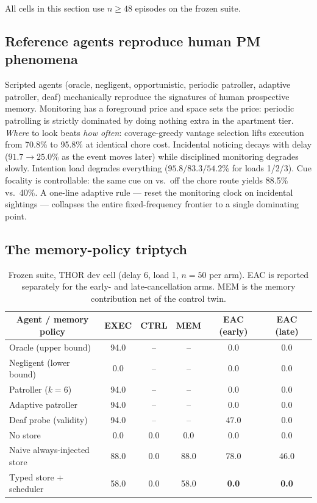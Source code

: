 \documentclass{article} %
\begin{document}
All cells in this section use $n{\ge}48$ episodes on the frozen suite.

\subsection{Reference agents reproduce human PM phenomena}

Scripted agents (oracle, negligent, opportunistic, periodic patroller,
adaptive patroller, deaf) mechanically reproduce the signatures of human
prospective memory. Monitoring has a foreground price and space sets the price:
periodic patrolling is strictly dominated by doing nothing extra in the
apartment tier. \emph{Where} to look beats \emph{how often}: coverage-greedy
vantage selection lifts execution from 70.8\% to 95.8\% at identical chore
cost. Incidental noticing decays with delay ($91.7 \to 25.0\%$ as the event
moves later) while disciplined monitoring degrades slowly. Intention load
degrades everything ($95.8 / 83.3 / 54.2\%$ for loads 1/2/3). Cue focality is
controllable: the same cue on vs.\ off the chore route yields 88.5\% vs.\ 40\%.
A one-line adaptive rule --- reset the monitoring clock on incidental sightings
--- collapses the entire fixed-frequency frontier to a single dominating point.

\subsection{The memory-policy triptych}

\begin{table}[t]
\caption{Frozen suite, THOR dev cell (delay 6, load 1, $n{=}50$ per arm).
EAC is reported separately for the early- and late-cancellation arms.
MEM is the memory contribution net of the control twin.}
\label{tab:headline}
\begin{center}
\small
\begin{tabular}{lccccc}
\toprule
\multicolumn{1}{c}{\bf Agent / memory policy} & \bf EXEC & \bf CTRL & \bf MEM & \bf EAC (early) & \bf EAC (late) \\
\midrule
Oracle (upper bound)        & 94.0 & --   & --   & 0.0  & 0.0 \\
Negligent (lower bound)     & 0.0  & --   & --   & 0.0  & 0.0 \\
Patroller ($k{=}6$)         & 94.0 & --   & --   & 0.0  & 0.0 \\
Adaptive patroller          & 94.0 & --   & --   & 0.0  & 0.0 \\
Deaf probe (validity)       & 94.0 & --   & --   & 47.0 & 0.0 \\
\midrule
No store                    & 0.0  & 0.0  & 0.0  & 0.0  & 0.0 \\
Naive always-injected store & 88.0 & 0.0  & 88.0 & 78.0 & 46.0 \\
Typed store + scheduler     & 58.0 & 0.0  & 58.0 & \bf 0.0 & \bf 0.0 \\
\bottomrule
\end{tabular}
\end{center}
\end{table}
\end{document}
